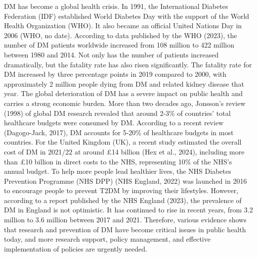 DM has become a global health crisis. In 1991, the International Diabetes Federation (IDF) established World Diabetes Day with the support of the World Health Organization (WHO). It also became an official United Nations Day in 2006 (WHO, no date). According to data published by the WHO (2023), the number of DM patients worldwide increased from 108 million to 422 million between 1980 and 2014. Not only has the number of patients increased dramatically, but the fatality rate has also risen significantly. The fatality rate for DM increased by three percentage points in 2019 compared to 2000, with approximately 2 million people dying from DM and related kidney disease that year. The global deterioration of DM has a severe impact on public health and carries a strong economic burden. More than two decades ago, Jonsson's review (1998) of global DM research revealed that around 2-3\% of countries' total healthcare budgets were consumed by DM. According to a recent review (Dagogo-Jack, 2017), DM accounts for 5-20\% of healthcare budgets in most countries. For the United Kingdom (UK), a recent study estimated the overall cost of DM in 2021/22 at around £14 billion (Hex et al., 2024), including more than £10 billion in direct costs to the NHS, representing 10\% of the NHS's annual budget. To help more people lead healthier lives, the NHS Diabetes Prevention Programme (NHS DPP) (NHS England, 2022) was launched in 2016 to encourage people to prevent T2DM by improving their lifestyles. However, according to a report published by the NHS England (2023), the prevalence of DM in England is not optimistic. It has continued to rise in recent years, from 3.2 million to 3.6 million between 2017 and 2021. Therefore, various evidence shows that research and prevention of DM have become critical issues in public health today, and more research support, policy management, and effective implementation of policies are urgently needed.


